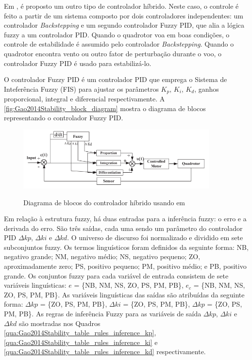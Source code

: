 %
%
%
Em \cite{Gao2014Stability}, é proposto um outro tipo de controlador híbrido. Neste caso, o controle é feito a partir de um sistema composto por dois controladores independentes: um controlador \textit{Backstepping} e um segundo controlador Fuzzy PID, que alia a lógica fuzzy a um controlador PID. Quando o quadrotor voa em boas condições, o controle de estabilidade é assumido pelo controlador \textit{Backstepping}. Quando o quadrotor encontra vento ou outro fator de perturbação durante o voo, o controlador Fuzzy PID é usado para estabilizá-lo.

O controlador Fuzzy PID é um controlador PID que emprega o Sistema de Inteferência Fuzzy (FIS) para ajustar os parâmetros $K_p$, $K_i$, $K_d$, ganhos proporcional, integral e diferencial respectivamente. A \autoref{fig:Gao2014Stability_block_diagram} mostra o diagrama de blocos representando o controlador Fuzzy PID.

\begin{figure}[!htb]
    \centering
    \caption{Diagrama de blocos do controlador híbrido usando em \cite{Gao2014Stability}}
    \includegraphics[width=0.9\textwidth]{./04-figuras/Gao2014Stability_block_diagram}
    \label{fig:Gao2014Stability_block_diagram}
\end{figure}

Em relação à estrutura fuzzy, há duas entradas para a inferência fuzzy: o erro e a derivada do erro. São três saídas, cada uma sendo um parâmetro do controlador PID $\Delta kp$, $\Delta ki$ e $\Delta kd$. O universo de discurso foi normalizado e dividido em sete subconjuntos fuzzy. Os termos linguísticos foram definidos da seguinte forma: NB, negativo grande; NM, negativo médio; NS, negativo pequeno; ZO, aproximadamente zero; PS, positivo pequeno; PM, positivo médio; e PB, positivo grande. Os conjuntos fuzzy para cada variável de entrada consistem de sete variáveis linguísticas: $e$ = \{NB, NM, NS, ZO, PS, PM, PB\}, $e_c$ = \{NB, NM, NS, ZO, PS, PM, PB\}. As variáveis linguísticas das saídas são atribuídas da seguinte forma: $\Delta kp$ = \{ZO, PS, PM, PB\}, $\Delta ki$ = \{ZO, PS, PM, PB\}, $\Delta kp$ = \{ZO, PS, PM, PB\}. As regras de inferência Fuzzy para as variáveis de saída $\Delta kp$, $\Delta ki$ e $\Delta kd$ são mostradas nos Quadros \ref{qua:Gao2014Stability_table_rules_inference_kp}, \ref{qua:Gao2014Stability_table_rules_inference_ki} e \ref{qua:Gao2014Stability_table_rules_inference_kd} respectivamente.

